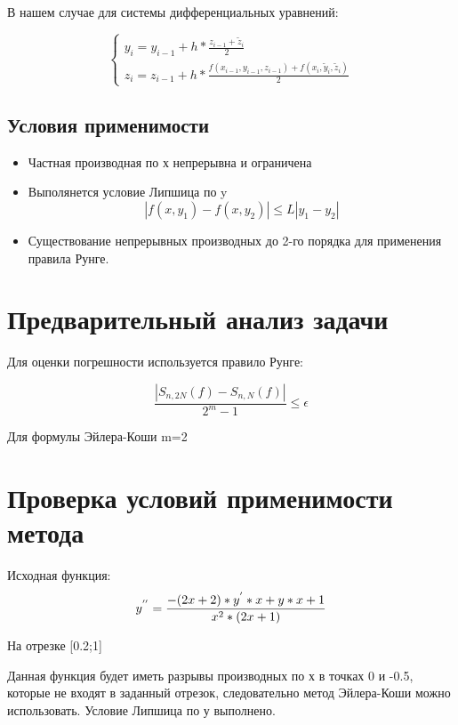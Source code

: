 В нашем случае для системы дифференциальных уравнений:

\begin{equation}
	\begin{cases}
		 y_{i} = y_{i-1} + h * \frac{z_{i-1}+\tilde z_{i}}{2} \\
	     z_{i} = z_{i-1} + h * \frac{f(x_{i-1},y_{i-1},z_{i-1})+f(x_{i},\tilde y_{i},\tilde z_{i}) }{2} 
	\end{cases}
\end{equation}

\subsection{Условия применимости}

\begin{itemize}
	\item Частная производная по х непрерывна и ограничена
	\item Выполянется условие Липшица по y
	\begin{equation}
		|f(x,y_{1})-f(x,y_{2})| \leq L|y_{1}-y_{2}|
	\end{equation}
	\item Существование непрерывных производных до 2-го порядка для применения правила Рунге.
\end{itemize}

\section{Предварительный анализ задачи}

Для оценки погрешности используется правило Рунге:

\begin{equation} 
	\frac{|S_{n,2N}(f)-S_{n,N}(f)|}{2^{m}-1} \leq \epsilon
\end{equation}

Для формулы Эйлера-Коши m=2

\section{Проверка условий применимости метода}

Исходная функция: 
\begin{equation}
	y^{''}=\frac{-(2x+2)*y^{'}*x+y*x+1}{x^{2}*(2x+1)} \\
\end{equation}

На отрезке [0.2;1]

Данная функция будет иметь разрывы производных по х в точках 0 и -0.5, которые не входят в заданный отрезок, следовательно метод Эйлера-Коши можно использовать. Условие Липшица по у выполнено. 


